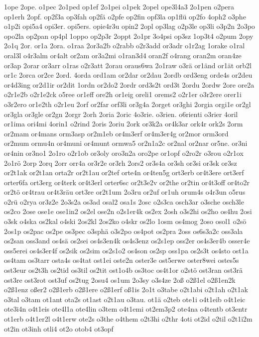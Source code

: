 {1ope
2ope.
o1pec
2o1ped
op1ef
2o1pei
o1pek
2opel
ope3l4a3
2o1pen
o2pera
op1erh
2opf.
op2f3a
op3fah
op2fä
o2pfe
op2fin
opf3la
op1flü
op2fo
4oph2
o3phe
o1p2i
opi5a4
opi3er.
opi5ers.
opie4r3u
opin2
2opl
op3lag
o2p3le
op3li
o3p2n
2o3po
opo2la
op2pan
op4pl
1oppo
op2p3r
2oppt
2o1pr
3o4psi
op3sz
1op3t4
o2pum
2opy
2o1q
2or.
or1a
2ora.
o1raa
2or3a2b
o2rabb
o2r3add
or3adr
o1r2ag
1orake
o1ral
oral3l
o4r3alm
or4alt
or2am
or3a2mi
o1ran3d4
oran2f
o4rang
oran2m
oran4ze
or3ap
2orar
or3arr
o1ras
o2r3att
2orau
oraus6wa
2o1raw
o3rä
or1änd
or1ät
orb2l
or1c
2orca
or2ce
2ord.
4orda
ord1am
or2dar
or2dau
2ordb
ord3eng
orde4s
or2deu
or4d3ing
or2d1ir
or2dit
1ordn
or2do2
2ordr
ord3s2t
ord3t
2ordu
2ordw
2ore
ore2a
o2r1e2b
o2r1e2ck
o5ree
or1eff
ore2h
or1eig
oreli1
orems2
o2r1er
o3r2ere
orer1i
o3r2ero
or1e2th
o2r1eu
2orf
or2far
orf3li
or3g4a
2orget
or3ghi
2orgia
orgi1e
or2gl
or3gla
or3gle
or2gn
2orgr
2orh
2oria
2oric
4o3rie.
o3rien.
o6rienti
o3rier
4oril
or1ima
ori4mi
4orin1
o2rind
2oris
2oriu
2ork
or3k2a
or4k3ar
ork4r
ork2s
2orm
or2mam
or4mans
orm3asp
or2m1eb
or4m3erf
or4m3er4g
or2mor
orm3ord
or2mum
ormu4n
or4muni
or4munt
ormwa5
or2n1a2c
or2nal
or2nar
or5ne.
or3ni
or4nin
or3no1
2o1ro
o2r1ob
or3oly
oro3n2a
oro2pe
or1opf
o2ro2r
o3rou
o2r1ox
2o1rö
2orp
2orq
2orr
orr4a
or3r2e
or3rh
2ors2
or3s4a
or3sh
or3si
or3sk
or3sz
or2t1ak
or2t1an
orta2r
or2t1au
or2tef
orte4n
or4ten5g
ort3erb
or4t3ere
ort3erf
orter6fa
ort3erg
or4terk
or4t3erl
orter6sc
or2t3e2v
or2the
or2tin
or4t3off
or4to2r
or2tö
or4trau
or4t3räu
ort3re
or2t1um
2o3ru
or2uf
or1uh
orum4s
o4r3un
o5rus
o2rü
o2rya
or3z2e
2o3s2a
os3ad
osal2
osa1s
2osc
o2s3ca
osch3ar
o3sche
osch3le
os2co
2ose
ose1e
ose1in2
os2el
ose2n
o2s1er4k
os2ex
2osh
o3s2hi
os2ho
os4hu
2osi
o3sk
o4ska
os2kal
o4ski
2os2kl
2os2ko
o4skr
os2lo
1osm
os4mog
2oso
osol1
o2sö
2os1p
os2pac
os2pe
os3pec
o3sphä
o3s2po
os4pot
os2pra
2oss
os6s3a2c
oss3ala
os2san
oss3and
os4sä
os2sei
os4s3en4k
os4s3enz
os2s1ep
oss2er
os4s3er4b
osser4e
oss5erei
os4s3er4f
os2sik
os2sim
os2s1o2
os4son
os2sp
oss1pa
os2s3t
os4sto
ost1a
os4tam
os3tarr
osta4s
os4tat
ost1ei
oste2n
oster3e
ost5erwe
oster8wei
ostes5s
ost3eur
os2t3h
os2tid
os3til
os2tit
ost1o4b
os3toc
os4t1or
o2stö
ost3ran
ost3rä
ost3re
ost3rot
ost3uf
os2tug
2osu4
os1um
2o3sy
o3s4ze
2oß
o2ß1el
o2ß1en2k
o2ß1enz
oßer2
o2ß1erb
o2ß1ere
o2ß1erf
oß1is
2o1t
o3tabe
o2t1abi
o2t1ah
o2t1ak
o3tal
o3tam
ot1ant
ota2s
ot1ast
o2t1au
o3tau.
ot1ä
o2teb
ote1i
o4t1eib
o4t1eic
ote3i4n
o4t1eis
ote4l1a
ote4lin
o3tem
o4t1emi
ot2em3p2
ote4na
o4tentb
ot3entr
ot1erb
o4t1er2l
o4t1erw
ote2s
o3the
o4them
o2t3hi
o2thr
4oti
ot2id
o2til
o2t1i2m
ot2in
ot3inh
otli4
ot2o
otob4
ot3opf
}
